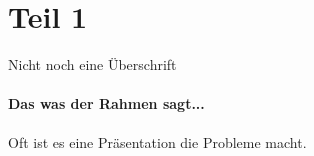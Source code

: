 \section{Teil 1}

\begin{frame}{Nicht noch eine Überschrift}
\framesubtitle{Das was der Rahmen sagt...}
Oft ist es eine Präsentation die Probleme macht.
\end{frame}
